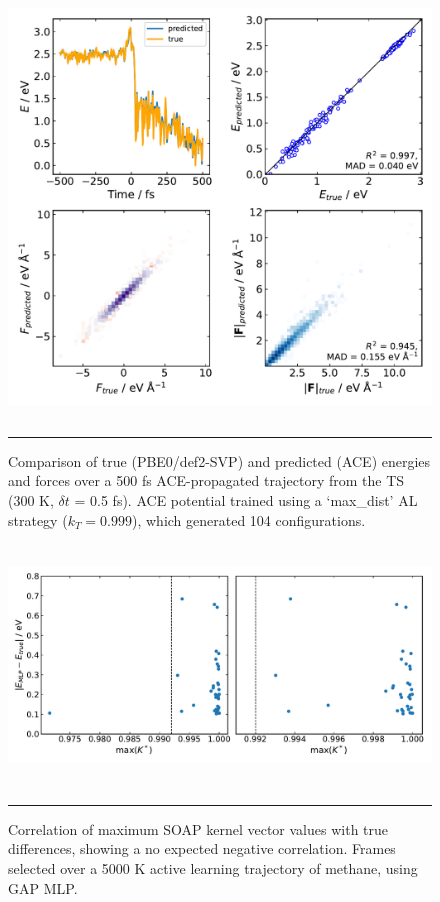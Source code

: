 \documentclass[11pt]{article}
\numberwithin{equation}{subsection}
\begin{document}
\begin{figure}[h!]
	\centering
	\includegraphics[height=11.2cm]{figSX28.pdf}
	\vspace{0.1cm}
	\hrule
	\vspace{0.1cm}
	\caption{Comparison of true (PBE0/def2-SVP) and predicted (ACE) energies and forces over a 500 fs ACE-propagated trajectory from the TS (300 K, $\delta t$ = 0.5 fs). ACE potential trained using a `max\_dist' AL strategy ($k_T = 0.999$), which generated 104 configurations.}
	\label{fig::SX28}
\end{figure}



\begin{figure}[h!]
	\centering
	\includegraphics[height=6.4cm]{figSX27.pdf}
	\vspace{0.1cm}
	\hrule
	\vspace{0.1cm}
	\caption{Correlation of maximum SOAP kernel vector values with true differences, showing a no expected negative correlation. Frames selected over a 5000 K active learning trajectory of methane, using GAP MLP.}
	\label{fig::SX27}
\end{figure}
\end{document}
